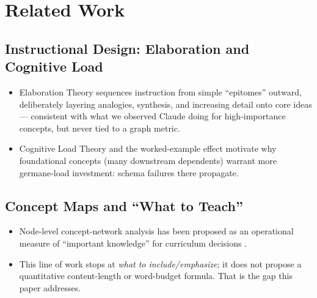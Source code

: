 
\section{Related Work}
\label{sec:related-work}

\subsection{Instructional Design: Elaboration and Cognitive Load}
\begin{itemize}
    \item Elaboration Theory \cite{reigeluth1983} sequences instruction from simple
          ``epitomes'' outward, deliberately layering analogies, synthesis, and
          increasing detail onto core ideas --- consistent with what we observed
          Claude doing for high-importance concepts, but never tied to a graph
          metric.
    \item Cognitive Load Theory \cite{sweller1988} and the worked-example effect
          \cite{renkl2014} motivate why foundational concepts (many downstream
          dependents) warrant more germane-load investment: schema failures there
          propagate.
\end{itemize}

\subsection{Concept Maps and ``What to Teach''}
\begin{itemize}
    \item Node-level concept-network analysis has been proposed as an operational
          measure of ``important knowledge'' for curriculum decisions
          \cite{conceptnetwork2025}.
    \item This line of work stops at \emph{what to include/emphasize}; it does not
          propose a quantitative content-length or word-budget formula. That is the
          gap this paper addresses.
\end{itemize}

